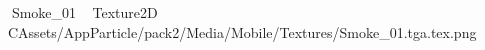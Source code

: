    Smoke_01             	   Texture2D	   C   Assets/AppParticle/pack2/Media/Mobile/Textures/Smoke_01.tga.tex.png